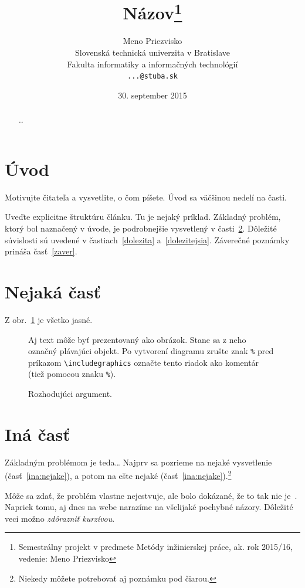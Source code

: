 \documentclass[10pt,twoside,slovak,a4paper]{article}
\title{Názov\thanks{Semestrálny projekt v predmete Metódy inžinierskej práce, ak. rok 2015/16, vedenie: Meno Priezvisko}} %
\author{Meno Priezvisko\\[2pt]
	{\small Slovenská technická univerzita v Bratislave}\\
	{\small Fakulta informatiky a informačných technológií}\\
	{\small \texttt{...@stuba.sk}}
	}
\date{\small 30. september 2015} %
\begin{document}
\maketitle

\begin{abstract}
\ldots
\end{abstract}



\section{Úvod}

Motivujte čitateľa a vysvetlite, o čom píšete. Úvod sa väčšinou nedelí na časti.

Uveďte explicitne štruktúru článku. Tu je nejaký príklad.
Základný problém, ktorý bol naznačený v úvode, je podrobnejšie vysvetlený v časti~\ref{nejaka}.
Dôležité súvislosti sú uvedené v častiach~\ref{dolezita} a~\ref{dolezitejsia}.
Záverečné poznámky prináša časť~\ref{zaver}.



\section{Nejaká časť} \label{nejaka}

Z obr.~\ref{f:rozhod} je všetko jasné. 

\begin{figure}[tbh]
\centering
Aj text môže byť prezentovaný ako obrázok. Stane sa z neho označný plávajúci objekt. Po vytvorení diagramu zrušte znak \texttt{\%} pred príkazom \verb|\includegraphics| označte tento riadok ako komentár (tiež pomocou znaku \texttt{\%}).
\caption{Rozhodujúci argument.}
\label{f:rozhod}
\end{figure}



\section{Iná časť} \label{ina}

Základným problémom je teda\ldots{} Najprv sa pozrieme na nejaké vysvetlenie (časť~\ref{ina:nejake}), a potom na ešte nejaké (časť~\ref{ina:nejake}).\footnote{Niekedy môžete potrebovať aj poznámku pod čiarou.}

Môže sa zdať, že problém vlastne nejestvuje\cite{Coplien:MPD}, ale bolo dokázané, že to tak nie je~\cite{Czarnecki:Staged, Czarnecki:Progress}. Napriek tomu, aj dnes na webe narazíme na všelijaké pochybné názory\cite{PLP-Framework}. Dôležité veci možno \emph{zdôrazniť kurzívou}.
\end{document}
